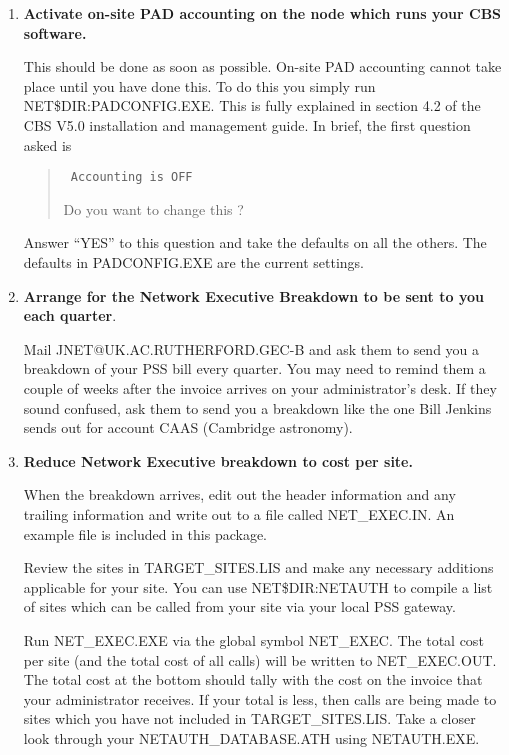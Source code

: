 \begin{enumerate}

\item {\bf Activate on-site PAD accounting on the node which runs your 
CBS software.}

This should be done as soon as possible. On-site PAD accounting cannot take
place until you have done this. To do this you simply run
NET\$DIR:PADCONFIG.EXE. This is fully explained in section 4.2 of the CBS
V5.0 installation and management guide. In brief, the first question asked
is 

\begin{quote} \tt
Accounting is OFF

Do you want to change this ?
\end{quote}


Answer ``YES'' to this question and take the defaults on all the others. The
defaults in PADCONFIG.EXE are the current settings. 

\item {\bf Arrange for the Network Executive Breakdown to be sent to you 
each quarter}.

Mail JNET@UK.AC.RUTHERFORD.GEC-B and ask them to send you a breakdown of
your PSS bill every quarter. You may need to remind them a couple of weeks
after the invoice arrives on your administrator's desk. If they sound
confused, ask them to send you a breakdown like the one Bill Jenkins sends
out for account CAAS (Cambridge astronomy). 

\item {\bf Reduce Network Executive breakdown to cost per site.}

When the breakdown arrives, edit out the header information and any trailing
information and write out to a file called NET\_\/EXEC.IN. An example file is
included in this package. 

Review the sites in TARGET\_\/SITES.LIS and make any necessary additions
applicable for your site. You can use NET\$DIR:NETAUTH to compile a list of
sites which can be called from your site via your local PSS gateway. 

Run NET\_\/EXEC.EXE via the global symbol NET\_\/EXEC. The total cost per site (and
the total cost of all calls) will be written to NET\_\/EXEC.OUT. The total cost at
the bottom should tally with the cost on the invoice that your administrator
receives. If your total is less, then calls are being made to sites which you
have not included in TARGET\_\/SITES.LIS. Take a closer look through your
NETAUTH\_\/DATABASE.ATH using NETAUTH.EXE. 


\end{enumerate}
